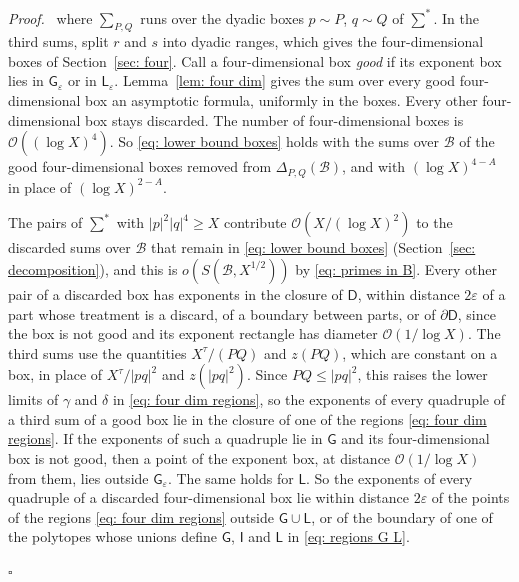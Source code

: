 \documentclass{article}
\numberwithin{equation}{section}
\newenvironment{proof}[1][Proof]{\par\medskip\noindent\textit{#1.}\ }{\hfill$\square$\par\medskip}
\newcommand{\Le}{\leqslant}
\newcommand{\Ge}{\geqslant}
\begin{document}
\begin{proof}
where $\sum_{P, Q}$ runs over the dyadic boxes $p \sim P$, $q \sim Q$ of $\sum^*$. In the third sums, split $r$ and $s$ into dyadic ranges, which gives the four-dimensional boxes of Section~\ref{sec: four}. Call a four-dimensional box \emph{good} if its exponent box lies in $\mathsf{G}_\varepsilon$ or in $\mathsf{L}_\varepsilon$. Lemma~\ref{lem: four dim} gives the sum over every good four-dimensional box an asymptotic formula, uniformly in the boxes. Every other four-dimensional box stays discarded. The number of four-dimensional boxes is $\mathcal{O}((\log X)^4)$. So \eqref{eq: lower bound boxes} holds with the sums over $\mathcal{B}$ of the good four-dimensional boxes removed from $\Delta_{P,Q}(\mathcal{B})$, and with $(\log X)^{4 - A}$ in place of $(\log X)^{2 - A}$.

The pairs of $\sum^*$ with $|p|^2|q|^4 \Ge X$ contribute $\mathcal{O}(X/(\log X)^2)$ to the discarded sums over $\mathcal{B}$ that remain in \eqref{eq: lower bound boxes} (Section~\ref{sec: decomposition}), and this is $o(S(\mathcal{B}, X^{1/2}))$ by \eqref{eq: primes in B}. Every other pair of a discarded box has exponents in the closure of $\mathsf{D}$, within distance $2\varepsilon$ of a part whose treatment is a discard, of a boundary between parts, or of $\partial\mathsf{D}$, since the box is not good and its exponent rectangle has diameter $\mathcal{O}(1/\log X)$. The third sums use the quantities $X^{\tau}/(PQ)$ and $z(PQ)$, which are constant on a box, in place of $X^{\tau}/|pq|^2$ and $z(|pq|^2)$. Since $PQ \Le |pq|^2$, this raises the lower limits of $\gamma$ and $\delta$ in \eqref{eq: four dim regions}, so the exponents of every quadruple of a third sum of a good box lie in the closure of one of the regions \eqref{eq: four dim regions}. If the exponents of such a quadruple lie in $\mathsf{G}$ and its four-dimensional box is not good, then a point of the exponent box, at distance $\mathcal{O}(1/\log X)$ from them, lies outside $\mathsf{G}_\varepsilon$. The same holds for $\mathsf{L}$. So the exponents of every quadruple of a discarded four-dimensional box lie within distance $2\varepsilon$ of the points of the regions \eqref{eq: four dim regions} outside $\mathsf{G} \cup \mathsf{L}$, or of the boundary of one of the polytopes whose unions define $\mathsf{G}$, $\mathsf{I}$ and $\mathsf{L}$ in \eqref{eq: regions G L}.


\end{proof}
\end{document}
